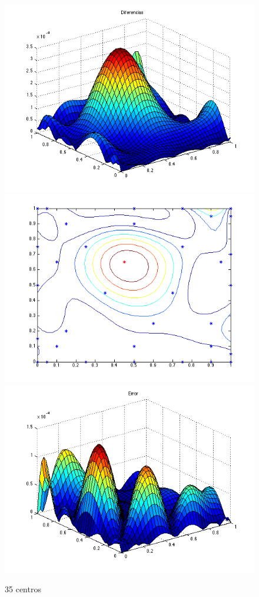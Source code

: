 \documentclass[11pt,a4paper]{article}
\begin{document}
\begin{figure}[H]
\centering

\includegraphics[scale=0.35]{diferencias35.png}
\includegraphics[scale=0.35]{centros35.png}
\includegraphics[scale=0.35]{error35.png}
\caption{35 centros}
\end{figure}
\end{document}

